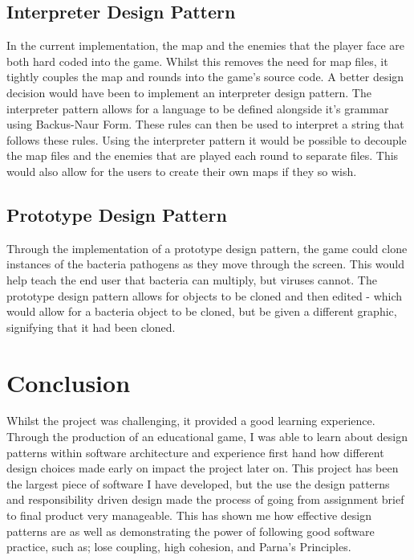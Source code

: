 \documentclass[a4paper,12pt]{article}
\begin{document}
\subsection*{Interpreter Design Pattern}
In the current implementation, the map and the enemies that the player face are both hard coded into the game. Whilst this removes the need for map files, it tightly couples the map and rounds into the game's source code. A better design decision would have been to implement an interpreter design pattern. The interpreter pattern allows for a language to be defined alongside it's grammar using Backus-Naur Form\cite{GoF-Book}. These rules can then be used to interpret a string that follows these rules. Using the interpreter pattern it would be possible to decouple the map files and the enemies that are played each round to separate files. This would also allow for the users to create their own maps if they so wish. 

\subsection*{Prototype Design Pattern}
Through the implementation of a prototype design pattern, the game could clone instances of the bacteria pathogens as they move through the screen. This would help teach the end user that bacteria can multiply, but viruses cannot. The prototype design pattern allows for objects to be cloned and then edited\cite{GoF-Book} - which would allow for a bacteria object to be cloned, but be given a different graphic, signifying that it had been cloned. 

\section*{Conclusion}
Whilst the project was challenging, it provided a good learning experience. Through the production of an educational game, I was able to learn about design patterns within software architecture and experience first hand how different design choices made early on impact the project later on. 
This project has been the largest piece of software I have developed, but the use the design patterns and responsibility driven design made the process of going from assignment brief to final product very manageable. This has shown me how effective design patterns are as well as demonstrating the power of following good software practice, such as; lose coupling, high cohesion, and Parna's Principles. 
\end{document}
